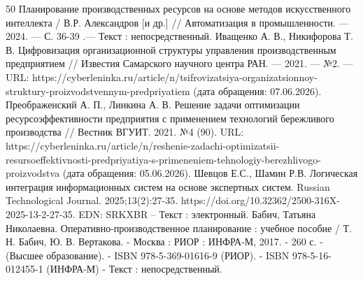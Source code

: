 \begin{thebibliography}{50}
 Планирование производственных ресурсов на основе методов искусственного интеллекта / В.Р. Александров [и др.] // Автоматизация в промышленности. — 2024. — С. 36-39 .— Текст : непосредственный.
 Иващенко А. В., Никифорова Т. В. Цифровизация организационной структуры управления производственным предприятием // Известия Самарского научного центра РАН.  — 2021.  — №2. —  URL: https://cyberleninka.ru/article/n/tsifrovizatsiya-organizatsionnoy-struktury-proizvodstvennym-predpriyatiem (дата обращения: 07.06.2026).
 Преображенский А. П., Линкина А. В. Решение задачи оптимизации ресурсоэффективности предприятия с применением технологий бережливого производства // Вестник ВГУИТ. 2021. №4 (90). URL: https://cyberleninka.ru/article/n/reshenie-zadachi-optimizatsii-resursoeffektivnosti-predpriyatiya-s-primeneniem-tehnologiy-berezhlivogo-proizvodstva (дата обращения: 05.06.2026).
 Шевцов Е.С., Шамин Р.В. Логическая интеграция информационных систем на основе экспертных систем. Russian Technological Journal. 2025;13(2):27-35. https://doi.org/10.32362/2500-316X-2025-13-2-27-35. EDN: SRKXBR – Текст : электронный.
 Бабич, Татьяна Николаевна. Оперативно-производственное планирование : учебное пособие / Т. Н. Бабич, Ю. В. Вертакова. - Москва : РИОР : ИНФРА-М, 2017. - 260 с. - (Высшее образование). - ISBN 978-5-369-01616-9 (РИОР). - ISBN 978-5-16-012455-1 (ИНФРА-М) - Текст : непосредственный.
\end{thebibliography}

